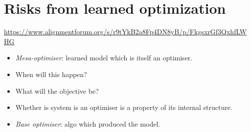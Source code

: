 \section{Risks from learned optimization}

\url{https://www.alignmentforum.org/s/r9tYkB2a8Fp4DN8yB/p/FkgsxrGf3QxhfLWHG}

\begin{itemize}
    \item \emph{Mesa-optimiser}: learned model which is itself an optimiser.
    \item When will this happen?
    \item What will the objective be?
    \item Whether is system is an optimiser is a property of its internal structure.
    \item \emph{Base optimiser}: algo which produced the model.
\end{itemize}

